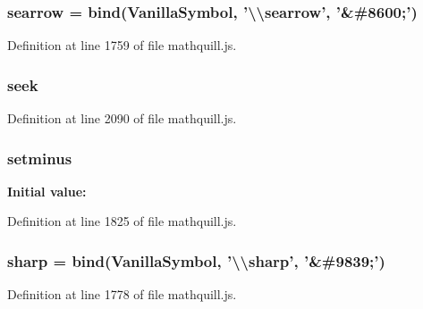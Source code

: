 \subsubsection[{searrow}]{ searrow = {\bf bind}({\bf Vanilla\-Symbol}, '\textbackslash{}\textbackslash{}searrow', '\&\#8600;')}\label{mathquill_8js_afa7497508b7d12c6fccbdd35ca3c95de}


Definition at line 1759 of file mathquill.\-js.

\subsubsection[{seek}]{\setlength{\rightskip}{0pt plus 5cm}{\bf \-\_\-} seek}\label{mathquill_8js_a283989d776dec5a8d7947b74588e800b}


Definition at line 2090 of file mathquill.\-js.

\subsubsection[{setminus}]{ setminus}\label{mathquill_8js_a632acaf61e6920a00b662d4aad4e9bff}
{\bfseries Initial value\-:}


Definition at line 1825 of file mathquill.\-js.

\subsubsection[{sharp}]{ sharp = {\bf bind}({\bf Vanilla\-Symbol}, '\textbackslash{}\textbackslash{}sharp', '\&\#9839;')}\label{mathquill_8js_a04040de03a052cb250b9dbeba6b3fb65}


Definition at line 1778 of file mathquill.\-js.

